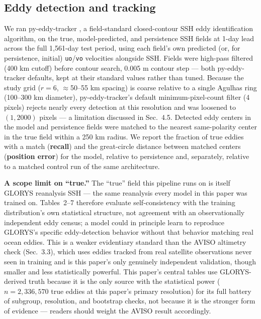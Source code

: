 \documentclass[11pt]{article}
\begin{document}
\subsection{Eddy detection and tracking}

We ran py-eddy-tracker \citep[]{Mason2014}, a field-standard closed-contour SSH eddy identification algorithm, on the true, model-predicted, and persistence SSH fields at 1-day lead across the full 1,561-day test period, using each field's own predicted (or, for persistence, initial) \texttt{uo}/\texttt{vo} velocities alongside SSH. Fields were high-pass filtered (400 km cutoff) before contour search, 0.005 m contour step --- both py-eddy-tracker defaults, kept at their standard values rather than tuned. Because the study grid ($r=6$, $\approx$50--55 km spacing) is coarse relative to a single Agulhas ring (100--300 km diameter), py-eddy-tracker's default minimum-pixel-count filter (4 pixels) rejects nearly every detection at this resolution and was loosened to $(1, 2000)$ pixels --- a limitation discussed in Sec.~4.5. Detected eddy centers in the model and persistence fields were matched to the nearest same-polarity center in the true field within a 250 km radius. We report the fraction of true eddies with a match (\textbf{recall}) and the great-circle distance between matched centers (\textbf{position error}) for the model, relative to persistence and, separately, relative to a matched control run of the same architecture.

\textbf{A scope limit on ``true.''} The ``true'' field this pipeline runs on is itself GLORYS reanalysis SSH --- the same reanalysis every model in this paper was trained on. Tables~2--7 therefore evaluate self-consistency with the training distribution's own statistical structure, not agreement with an observationally independent eddy census; a model could in principle learn to reproduce GLORYS's specific eddy-detection behavior without that behavior matching real ocean eddies. This is a weaker evidentiary standard than the AVISO altimetry check (Sec.~3.3), which uses eddies tracked from real satellite observations never seen in training and is this paper's only genuinely independent validation, though smaller and less statistically powerful. This paper's central tables use GLORYS-derived truth because it is the only source with the statistical power ($n=2{,}336{,}570$ true eddies at this paper's primary resolution) for its full battery of subgroup, resolution, and bootstrap checks, not because it is the stronger form of evidence --- readers should weight the AVISO result accordingly.
\end{document}

